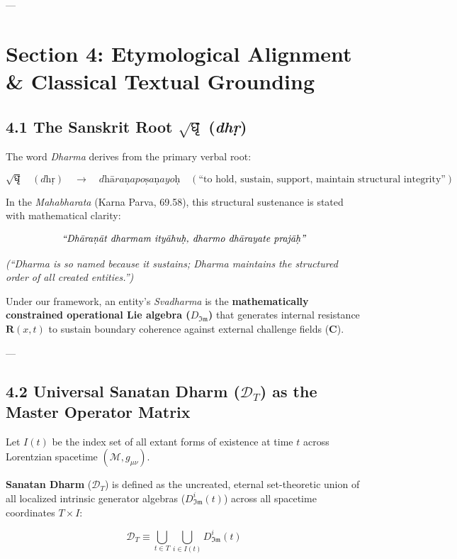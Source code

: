 \documentclass[11pt,a4paper]{article}
\theoremstyle{definition}
\theoremstyle{remark}
\begin{document}
---

\section{Section 4: Etymological Alignment \& Classical Textual Grounding}

\subsection{4.1 The Sanskrit Root $\sqrt{\text{धृ}}$ (\textit{dhṛ})}
The word \textit{Dharma} derives from the primary verbal root:

\begin{equation}
\sqrt{\text{धृ}} \quad (\textit{dhṛ}) \quad \longrightarrow \quad \textit{dhāraṇapoṣaṇayoḥ} \quad (\text{“to hold, sustain, support, maintain structural integrity”})
\end{equation}


In the \textit{Mahabharata} (Karna Parva, 69.58), this structural sustenance is stated with mathematical clarity:

\begin{equation}
\text{\textit{“Dhāraṇāt dharmam ityāhuḥ, dharmo dhārayate prajāḥ”}}
\end{equation}

\textit{(“Dharma is so named because it sustains; Dharma maintains the structured order of all created entities.”)}

Under our framework, an entity's \textit{Svadharma} is the \textbf{mathematically constrained operational Lie algebra ($D_{\mathfrak{Im}}$)} that generates internal resistance $\mathbf{R}(x, t)$ to sustain boundary coherence against external challenge fields ($\mathbf{C}$).

---

\subsection{4.2 Universal Sanatan Dharm ($\mathcal{D}_T$) as the Master Operator Matrix}
Let $I(t)$ be the index set of all extant forms of existence at time $t$ across Lorentzian spacetime $(\mathcal{M}, g_{\mu\nu})$.

\textbf{Sanatan Dharm} ($\mathcal{D}_T$) is defined as the uncreated, eternal set-theoretic union of all localized intrinsic generator algebras ($D_{\mathfrak{Im}}^i(t)$) across all spacetime coordinates $T \times I$:


\begin{equation}
\mathcal{D}_T \equiv \bigcup_{t \in T} \bigcup_{i \in I(t)} D_{\mathfrak{Im}}^i(t)
\end{equation}
\end{document}
